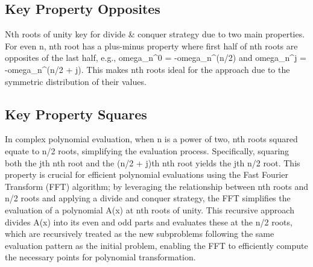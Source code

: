 \subsection*{Key Property  Opposites}
Nth roots of unity key for divide \& conquer strategy due to two main properties.
For even n, nth root has a plus-minus property where first half of nth roots are opposites of the last half, e.g., omega\_n\textasciicircum{}0 = -omega\_n\textasciicircum{}(n/2) and omega\_n\textasciicircum{}j = -omega\_n\textasciicircum{}(n/2 + j).
This makes nth roots ideal for the approach due to the symmetric distribution of their values.

\subsection*{Key Property  Squares}
In complex polynomial evaluation, when n is a power of two, nth roots squared equate to n/2 roots, simplifying the evaluation process.
Specifically, squaring both the jth nth root and the (n/2 + j)th nth root yields the jth n/2 root.
This property is crucial for efficient polynomial evaluations using the Fast Fourier Transform (FFT) algorithm; by leveraging the relationship between nth roots and n/2 roots and applying a divide and conquer strategy, the FFT simplifies the evaluation of a polynomial A(x) at nth roots of unity.
This recursive approach divides A(x) into its even and odd parts and evaluates these at the n/2 roots, which are recursively treated as the new subproblems following the same evaluation pattern as the initial problem, enabling the FFT to efficiently compute the necessary points for polynomial transformation.


